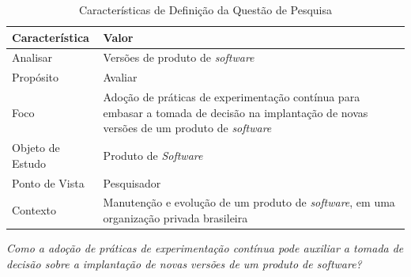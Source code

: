 \begin{table}[h!]
\centering
    \caption{Características de Definição da Questão de Pesquisa}
        \begin{tabular}{|p{4cm}|p{10cm}|}
            \hline
            \textbf{Característica} & \textbf{Valor} \\
            \hline
            Analisar & Versões de produto de \textit{software} \\
            Propósito & Avaliar \\
            Foco & Adoção de práticas de experimentação contínua para embasar a tomada de decisão na implantação de novas versões de um produto de \textit{software} \\
            Objeto de Estudo & Produto de \textit{Software} \\
            Ponto de Vista & Pesquisador \\
            Contexto & Manutenção e evolução de um produto de \textit{software}, em uma organização privada brasileira \\
            \hline
        \end{tabular}
   
 
    \begin{center}
    \end{center}

    \label{tab:gqm}
\end{table}



\begin{center}
    \textit{Como a adoção de práticas de experimentação contínua pode auxiliar a tomada de decisão sobre a implantação de novas versões de um produto de software?}   
\end{center}
